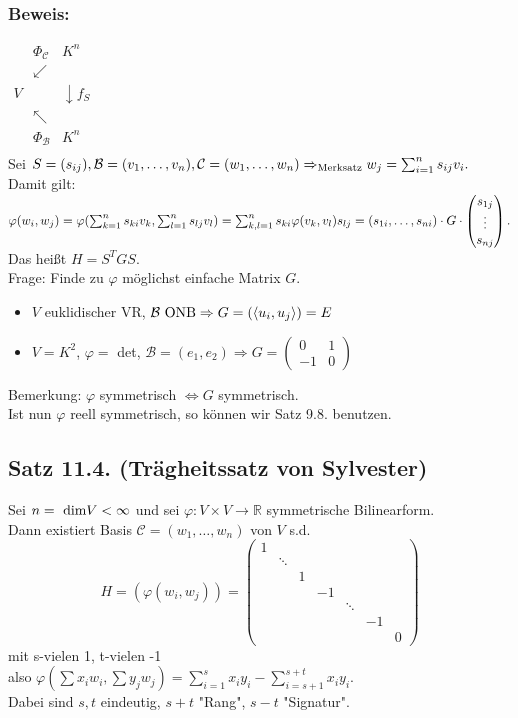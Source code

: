 \documentclass[a4paper, 12pt]{extarticle}
\newcommand{\twoXtwo}[4] {
	\left( 
	\begin{matrix}
		#1 & #2 \\
		#3 & #4
	\end{matrix} 
	\right)
}
\newcommand{\vecThree}[3] {
	\left( 
	\begin{matrix}
		#1\\
		#2\\
		#3
	\end{matrix} 
	\right)
}
\newcommand{\skalar}[2] {
	\langle #1, #2\rangle
}
\newcommand{\tn}[1]{\textnormal {#1}}
\begin{document}
\subsubsection*{Beweis:}
$\begin{matrix}
	 & \Phi_{\mathcal{C}} & K^n\\
	 & \swarrow\\
	V & & \downarrow f_S\\
	 & \nwarrow\\
	 & \Phi_{\mathcal{B}} & K^n\\ 
\end{matrix}$\\
Sei $S = (s_{ij}), \mathcal{B} = (v_1, \dots, v_n), \mathcal{C} = (w_1, \dots, w_n)\\
\Rightarrow_{\tn{Merksatz}} w_j = \sum_{i=1}^{n}s_{ij}v_i.$\\
Damit gilt: $\varphi(w_i, w_j) = \varphi(\sum_{k=1}^{n}s_{ki}v_k, \sum_{l=1}^{n}s_{lj}v_l)\\
= \sum_{k, l =1}^{n}s_{ki}\varphi(v_k, v_l)s_{lj} = (s_{1i}, \dots, s_{ni}) \cdot G \cdot \vecThree{s_{1j}}{\vdots}{s_{nj}}.$\\
Das heißt $H = S^TGS.$\\
Frage: Finde zu $\varphi$ möglichst einfache Matrix $G$.\\
\begin{itemize}
	\item $V$ euklidischer VR, $\mathcal{B} \tn{ ONB} \Rightarrow G = (\skalar{u_i}{u_j}) = E$
	\item $V = K^2$, $\varphi =$ det, $\mathcal{B} = (e_1, e_2) \Rightarrow G = \twoXtwo{0}{1}{-1}{0}$
\end{itemize}
Bemerkung: $\varphi$ symmetrisch $\Leftrightarrow G$ symmetrisch.\\
Ist nun $\varphi$ reell symmetrisch, so können wir Satz 9.8. benutzen.
\subsection*{Satz 11.4. (Trägheitssatz von Sylvester)}
Sei $n = \tn{ dim}V < \infty$ und sei $\varphi:V\times V \longrightarrow \mathbb{R}$ symmetrische Bilinearform.\\
Dann existiert Basis $\mathcal{C} = (w_1, \dots, w_n)$ von $V$ s.d. $$H = (\varphi(w_i, w_j)) = \left(\begin{matrix}
	1 & & & & & & \\
	 & \ddots & & & & & \\
	 & & 1 & & & & \\
	 & & & -1 & & & \\
	 & & & & \ddots & & \\
	 & & & & & -1 & \\
	 & & & & & & 0
\end{matrix} \right)$$ mit s-vielen 1, t-vielen -1\\
also $\varphi(\sum x_iw_i, \sum y_jw_j) = \sum_{i=1}^{s}x_iy_i - \sum_{i=s+1}^{s+t}x_iy_i.$\\
Dabei sind $s, t$ eindeutig, $s+t$ "Rang", $s-t$ "Signatur".
\end{document}
